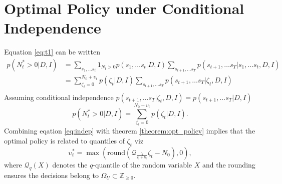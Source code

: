 \section{Optimal Policy under Conditional Independence}
Equation \eqref{eq:t1} can be written
\begin{equation}
	\begin{split}
		p(N_t^* > 0 | D, I) &= \sum_{s_1,\dots s_t}1_{N_{t}> 0}p(s_1,\dots s_t|D,I)\sum_{s_{t+1},\dots s_T}p(s_{t+1},\dots s_T|s_1,\dots s_t,D,I)\\
		& = \sum_{\zeta_t=0}^{N_0+\upsilon_t}p(\zeta_t|D,I)\sum_{s_{t+1},\dots s_T}p(s_{t+1},\dots s_T|\zeta_t,D,I)\\
	\end{split}
\end{equation}
Assuming conditional independence $p(s_{t+1},\dots s_T|\zeta_t,D,I)=p(s_{t+1},\dots s_T|D,I)$
\begin{equation}
	p(N_t^* > 0 | D, I)  = \sum_{\zeta_t=0}^{N_0+\upsilon_t}p(\zeta_t|D,I).
	\label{eq:indep}
\end{equation}
Combining eqation \eqref{eq:indep} with theorem \ref{theorem:opt_policy} implies that the optimal policy is related to quantiles of $\zeta_t$ viz
\begin{equation}
	\upsilon_t^* = \max(\text{round}(\mathcal{Q}_{\frac{c_t}{c_t+h_t}}\zeta_t-N_0),0),
	\label{eq:opt}
\end{equation}
where $\mathcal{Q}_q(X)$ denotes the $q$-quantile of the random variable $X$ and the rounding ensures the decisions belong to $\Omega_U\subset \mathbb{Z}_{\geq 0}$. 

